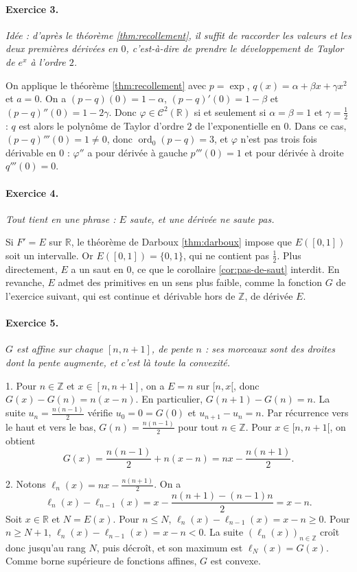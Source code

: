 \documentclass[11pt,a4paper]{article}
\theoremstyle{plain}
\theoremstyle{definition}
\theoremstyle{remark}
\newcommand{\Z}{\mathbb{Z}}
\newcommand{\R}{\mathbb{R}}
\newcommand{\Cc}{\mathcal{C}}
\newcommand{\1}{\mathbf{1}}
\DeclareMathOperator{\ord}{ord}
\begin{document}
\paragraph{Exercice 3.} \emph{Idée : d'après le théorème \ref{thm:recollement}, il suffit de raccorder les valeurs et les deux premières dérivées en $0$, c'est-à-dire de prendre le développement de Taylor de $e^x$ à l'ordre $2$.}

On applique le théorème \ref{thm:recollement} avec $p=\exp$, $q(x)=\alpha+\beta x+\gamma x^2$ et $a=0$. On a $(p-q)(0)=1-\alpha$, $(p-q)'(0)=1-\beta$ et $(p-q)''(0)=1-2\gamma$. Donc $\varphi\in\Cc^2(\R)$ si et seulement si $\alpha=\beta=1$ et $\gamma=\frac12$ : $q$ est alors le polynôme de Taylor d'ordre $2$ de l'exponentielle en $0$. Dans ce cas, $(p-q)'''(0)=1\neq0$, donc $\ord_0(p-q)=3$, et $\varphi$ n'est pas trois fois dérivable en $0$ : $\varphi''$ a pour dérivée à gauche $p'''(0)=1$ et pour dérivée à droite $q'''(0)=0$.

\paragraph{Exercice 4.} \emph{Tout tient en une phrase : $E$ saute, et une dérivée ne saute pas.}

Si $F'=E$ sur $\R$, le théorème de Darboux \ref{thm:darboux} impose que $E([0,1])$ soit un intervalle. Or $E([0,1])=\{0,1\}$, qui ne contient pas $\frac12$. Plus directement, $E$ a un saut en $0$, ce que le corollaire \ref{cor:pas-de-saut} interdit. En revanche, $E$ admet des primitives en un sens plus faible, comme la fonction $G$ de l'exercice suivant, qui est continue et dérivable hors de $\Z$, de dérivée $E$.

\paragraph{Exercice 5.} \emph{$G$ est affine sur chaque $[n,n+1]$, de pente $n$ : ses morceaux sont des droites dont la pente augmente, et c'est là toute la convexité.}

1. Pour $n\in\Z$ et $x\in[n,n+1]$, on a $E=n$ sur $[n,x[$, donc $G(x)-G(n)=n(x-n)$. En particulier, $G(n+1)-G(n)=n$. La suite $u_n=\frac{n(n-1)}2$ vérifie $u_0=0=G(0)$ et $u_{n+1}-u_n=n$. Par récurrence vers le haut et vers le bas, $G(n)=\frac{n(n-1)}2$ pour tout $n\in\Z$. Pour $x\in[n,n+1[$, on obtient
\[
  G(x)=\frac{n(n-1)}2+n(x-n)=nx-\frac{n(n+1)}2 .
\]

2. Notons $\ell_n(x)=nx-\frac{n(n+1)}2$. On a
\[
  \ell_n(x)-\ell_{n-1}(x)=x-\frac{n(n+1)-(n-1)n}2=x-n .
\]
Soit $x\in\R$ et $N=E(x)$. Pour $n\leq N$, $\ell_n(x)-\ell_{n-1}(x)=x-n\geq0$. Pour $n\geq N+1$, $\ell_n(x)-\ell_{n-1}(x)=x-n<0$. La suite $(\ell_n(x))_{n\in\Z}$ croît donc jusqu'au rang $N$, puis décroît, et son maximum est $\ell_N(x)=G(x)$. Comme borne supérieure de fonctions affines, $G$ est convexe.
\end{document}
